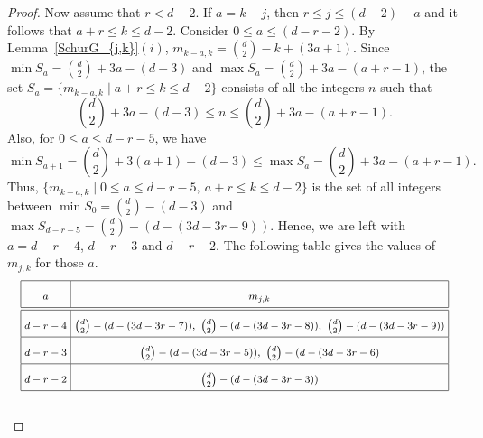 \documentclass[preprint,sort&compress,12pt]{elsarticle}
\numberwithin{equation}{section}
\theoremstyle{definition}
\begin{document}
\begin{proof}
Now assume that $r<d-2$.  If $a=k-j$, then ${r \le j \le (d-2)-a}$ and it follows that ${a+r \le k \le d-2}$. 
Consider ${0 \le a \le (d-r-2)}$. By Lemma~\ref{SchurG_{j,k}}$(i)$, $m_{k-a,k}
=\binom{d}{2}-k+(3a+1)$. Since $\min {S_{a}}=\binom{d}{2}+3a-(d-3) $ and $ {\max{S_{a}}= \binom{d}{2}+3a -(a+r-1)}$, the set
$S_a={\{m_{k-a,k}\mid a+r \le k \le d-2\}}$  consists of all the integers $n$ such that
$$ \binom{d}{2}+3a-(d-3) \leq n \leq  \binom{d}{2}+3a -(a+r-1).$$
Also, for  $0\leq a \leq d-r-5$, we have $${\min{S_{a+1}}=\binom{d}{2}+3(a+1)-(d-3)\le \max{S_{a}}=\binom{d}{2}+3a -(a+r-1)}.$$ 
Thus, 
${\{m_{k-a,k} \mid 0\leq a \leq d-r-5,\ a+r \leq k \leq d-2\}}$  is the set of all integers between $\min{S_0}=\binom{d}{2}-(d-3)$ and ${\max{S_{d-r-5}}=\binom{d}{2}-(d-(3d-3r-9))}$. 
Hence, we are left with ${a=d-r-4}$, ${d-r-3}$ and $d-r-2$. The following table gives the values of $m_{j,k}$ for those $a$.
\[\setlength{\tabcolsep}{3pt} %
\renewcommand{\arraystretch}{2.2} %
{\footnotesize
\begin{tabular}{|c|c |} 
	\hline
	$a$ &  $m_{j,k}$ \\ [0.005ex] 
	\hline\hline 
    $d-r-4$ & $\binom{d}{2}-(d-(3d-3r-7)),~\binom{d}{2}-(d-(3d-3r-8)),~\binom{d}{2}-(d-(3d-3r-9))$\\
    \hline
    $d-r-3$ & $\binom{d}{2}-(d-(3d-3r-5)),~\binom{d}{2}-(d-(3d-3r-6)$\\
    \hline
    $d-r-2$ & $\binom{d}{2}-(d-(3d-3r-3))$\\
    \hline
    \end{tabular}}\]\\

\end{proof}
\end{document}
